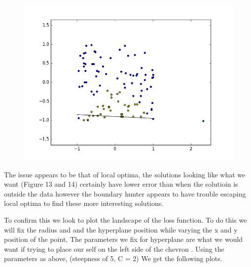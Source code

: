 \documentclass{article}
\begin{document}
\begin{figure}[H]
  \centering
  \begin{minipage}[b]{0.5\textwidth}
    \includegraphics[width=\textwidth]{BoundaryHunter-Attempt3-R2.png}
    \caption{}
  \end{minipage}
  \hfill
\end{figure}

The issue appears to be that of local optima, the solutions looking like what we want (Figure 13 and 14) certainly have lower error than when the solutioin is outside the data however the boundary hunter appears to have trouble escaping local optima to find these more interesting solutions.

To confirm this we look to plot the landscape of the loss function. To do this we will fix the radius and and the hyperplane position while varying the x and y position of the point, The parameters we fix for hyperplane are what we would want if trying to place our self on the left side of the chevron . Using the parameters as above, (steepness of 5, C = 2) We get the following plots.
\end{document}
